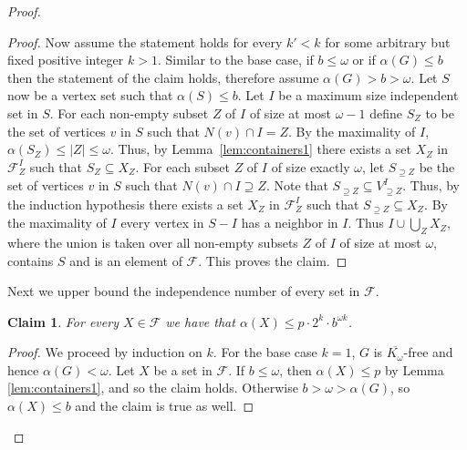 \documentclass[11pt]{amsart}
\newtheorem{claim}{Claim}[theorem]
\newcommand{\cal}{\mathcal}
\newcounter{tbox}
\newcommand{\sta}[1]{\vspace*{0.3cm}\refstepcounter{tbox}\noindent{ \parbox{\textwidth}{(\thetbox) \emph{#1}}}\vspace*{0.3cm}}
\begin{document}
\begin{proof}
\begin{proof}
Now assume the statement holds for every $k'<k$ for some arbitrary but fixed positive integer $k >1$.
Similar to the base case, if $b \leq \omega$ or if $\alpha(G) \leq b$ then the statement of the claim holds, therefore assume $\alpha(G) > b > \omega$. 
%
Let $S$ now be a vertex set such that $\alpha(S) \leq b$. Let $I$ be a maximum size independent set in $S$. 
%
For each non-empty subset $Z$ of $I$ of size at most $\omega-1$ define $S_Z$ to be the set of vertices $v$ in $S$ such that $N(v) \cap I = Z$. 
%
By the maximality of $I$, $\alpha(S_Z) \leq |Z| \leq \omega$. Thus, by Lemma~\ref{lem:containers1} there exists a set $X_Z$ in ${\cal F}_Z^I$ such that $S_Z \subseteq X_Z$. 
%
For each subset $Z$ of $I$ of size exactly $\omega$, let $S_{\supseteq Z}$ be the set of vertices $v$ in $S$ such that $N(v) \cap I \supseteq Z$. Note that $S_{\supseteq Z} \subseteq V_{\supseteq Z}^I$. Thus, by the induction hypothesis there exists a set $X_Z$ in ${\cal F}_Z^I$ such that $S_{\supseteq Z} \subseteq X_Z$. 
%
By the maximality of $I$ every vertex in $S-I$ has a neighbor in $I$. Thus $I \cup \bigcup_{Z} X_Z$, where the union is taken over all non-empty subsets $Z$
of $I$ of size at most $\omega$, contains $S$ and is an element of ${\cal F}$. This proves the claim. %
\end{proof}
%
Next we upper bound the independence number of every set in ${\cal F}$.

\begin{claim}\label{clm:alphaBound2}
For every $X \in {\cal F}$ we have that $\alpha(X) \leq p \cdot 2^k \cdot b^{\omega k}$.
%
\end{claim}

\begin{proof}
We proceed by induction on $k$. 
For the base case $k = 1$, $G$ is $\overline{K_\omega}$-free and hence $\alpha(G) < \omega$. 
Let $X$ be a set in ${\cal F}$.
If $b \leq \omega$, then $\alpha(X) \leq p$ by Lemma \ref{lem:containers1}, and so the claim holds.  
Otherwise $b > \omega > \alpha(G)$, so $\alpha(X) \leq b$ and the claim is true as well.


\end{proof}
\end{proof}
\end{document}
